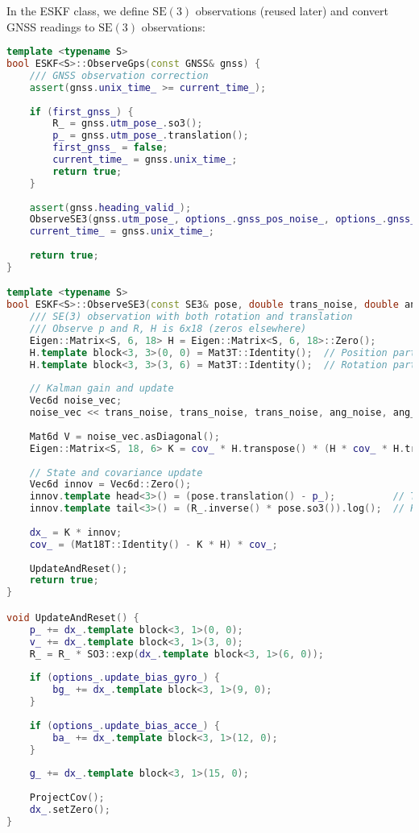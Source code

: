 In the ESKF class, we define $\mathrm{SE}(3)$ observations (reused later) and convert GNSS readings to $\mathrm{SE}(3)$ observations:
\begin{lstlisting}[language=c++, caption=src/ch3/eskf.hpp]
template <typename S>
bool ESKF<S>::ObserveGps(const GNSS& gnss) {
	/// GNSS observation correction
	assert(gnss.unix_time_ >= current_time_);
	
	if (first_gnss_) {
		R_ = gnss.utm_pose_.so3();
		p_ = gnss.utm_pose_.translation();
		first_gnss_ = false;
		current_time_ = gnss.unix_time_;
		return true;
	}
	
	assert(gnss.heading_valid_);
	ObserveSE3(gnss.utm_pose_, options_.gnss_pos_noise_, options_.gnss_ang_noise_);
	current_time_ = gnss.unix_time_;
	
	return true;
}

template <typename S>
bool ESKF<S>::ObserveSE3(const SE3& pose, double trans_noise, double ang_noise) {
	/// SE(3) observation with both rotation and translation
	/// Observe p and R, H is 6x18 (zeros elsewhere)
	Eigen::Matrix<S, 6, 18> H = Eigen::Matrix<S, 6, 18>::Zero();
	H.template block<3, 3>(0, 0) = Mat3T::Identity();  // Position part
	H.template block<3, 3>(3, 6) = Mat3T::Identity();  // Rotation part (Eq.3.66)
	
	// Kalman gain and update
	Vec6d noise_vec;
	noise_vec << trans_noise, trans_noise, trans_noise, ang_noise, ang_noise, ang_noise;
	
	Mat6d V = noise_vec.asDiagonal();
	Eigen::Matrix<S, 18, 6> K = cov_ * H.transpose() * (H * cov_ * H.transpose() + V).inverse();
	
	// State and covariance update
	Vec6d innov = Vec6d::Zero();
	innov.template head<3>() = (pose.translation() - p_);          // Translation
	innov.template tail<3>() = (R_.inverse() * pose.so3()).log();  // Rotation (Eq.3.67)
	
	dx_ = K * innov;
	cov_ = (Mat18T::Identity() - K * H) * cov_;
	
	UpdateAndReset();
	return true;
}

void UpdateAndReset() {
	p_ += dx_.template block<3, 1>(0, 0);
	v_ += dx_.template block<3, 1>(3, 0);
	R_ = R_ * SO3::exp(dx_.template block<3, 1>(6, 0));
	
	if (options_.update_bias_gyro_) {
		bg_ += dx_.template block<3, 1>(9, 0);
	}
	
	if (options_.update_bias_acce_) {
		ba_ += dx_.template block<3, 1>(12, 0);
	}
	
	g_ += dx_.template block<3, 1>(15, 0);
	
	ProjectCov();
	dx_.setZero();
}
\end{lstlisting}


